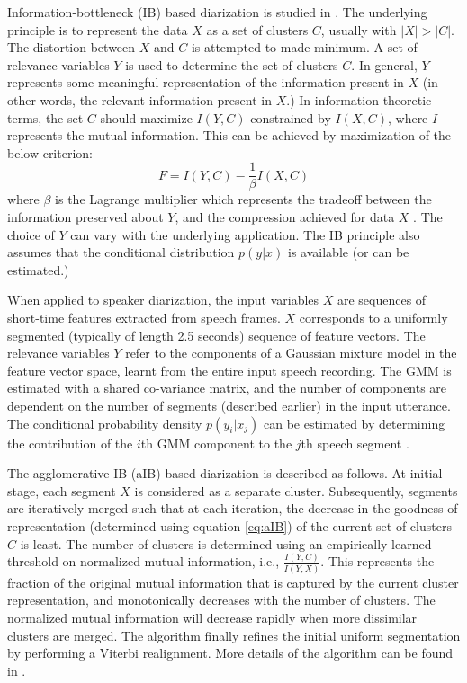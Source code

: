 \documentclass[conference]{IEEEtran}
\begin{document}
Information-bottleneck (IB) based diarization is studied in
\cite{deepuThesis}. The underlying principle is to represent the data $X$ as a
set of clusters $C$, usually with $|X|>|C|$. The distortion between $X$ and $C$
is attempted to made minimum. A set of relevance variables $Y$ is used to
determine the set of clusters $C$. In general, $Y$ represents some meaningful
representation of the information present in $X$ (in other words, the relevant
information present in $X$.) In information theoretic terms, the set $C$ 
should maximize $I(Y,C)$ constrained by
$I(X,C)$, where $I$ represents the mutual information. This can be achieved by
maximization of the below criterion:
\begin{equation}
\label{eq:aIB}
F = I(Y,C) - \frac{1}{\beta}I(X,C) 
\end{equation}
where $\beta$ is the Lagrange multiplier which represents the tradeoff between
the information preserved about $Y$, and the compression achieved for data $X$
\cite{deepuThesis}. The choice of $Y$ can vary with the underlying
application. The IB principle also assumes that the conditional distribution
$p(y|x)$ is available (or can be estimated.)

When applied to speaker diarization, the input variables $X$ are sequences of
short-time features extracted from speech frames. $X$ corresponds to a uniformly
segmented (typically of length 2.5 seconds) sequence of feature vectors. The
relevance variables $Y$ refer to the components of a Gaussian mixture model in
the feature vector space, learnt from the entire input speech recording. The GMM is
estimated with a shared co-variance matrix, and the number of components are
dependent on the number of segments (described earlier) in the input utterance.
The conditional probability density $p(y_i|x_j)$ can be estimated by determining
the contribution of the $i$th GMM component to the $j$th speech segment
\cite{deepuThesis}.

The agglomerative IB (aIB) based diarization is described as follows. At
initial stage, each segment $X$ is
considered as a separate cluster. Subsequently, segments are iteratively merged such that 
at each iteration, the decrease in the goodness of representation (determined using 
equation \ref{eq:aIB}) of the current set of clusters $C$ is least. The number of 
clusters is determined using an empirically learned threshold on normalized mutual 
information, i.e., $\frac{I(Y,C)}{I(Y,X)}$. This represents the 
fraction of the original mutual information that is captured by the current cluster
representation, and monotonically decreases with the number of clusters.  The
normalized mutual information will decrease rapidly when more dissimilar clusters are merged. The
algorithm finally refines the initial uniform segmentation by performing a
Viterbi realignment. More details of the algorithm 
can be found in \cite{deepuThesis}.
\end{document}

